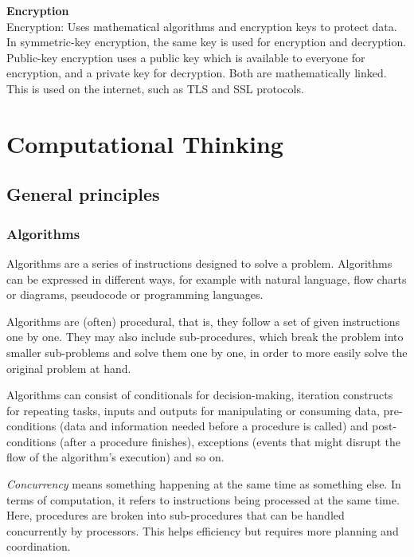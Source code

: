 \documentclass{article}
\begin{document}
\textbf{Encryption} \\
Encryption: Uses mathematical algorithms and encryption keys to protect data.
In symmetric-key encryption, the same key is used for encryption and
decryption. Public-key encryption uses a public key which is available to
everyone for encryption, and a private key for decryption. Both are
mathematically linked. This is used on the internet, such as TLS and SSL
protocols.

\section{Computational Thinking}

\subsection{General principles}

\subsubsection{Algorithms}
Algorithms are a series of instructions designed to solve a problem.
Algorithms can be expressed in different ways, for example with natural
language, flow charts or diagrams, pseudocode or programming languages.

Algorithms are (often) procedural, that is, they follow a set of given
instructions one by one. They may also include sub-procedures, which break the
problem into smaller sub-problems and solve them one by one, in order to more
easily solve the original problem at hand.

Algorithms can consist of conditionals for decision-making, iteration
constructs for repeating tasks, inputs and outputs for manipulating or
consuming data, pre-conditions (data and information needed before a procedure
is called) and post-conditions (after a procedure finishes), exceptions (events
that might disrupt the flow of the algorithm's execution) and so on.

\textit{Concurrency} means something happening at the same time as something
else. In terms of computation, it refers to instructions being processed at
the same time. Here, procedures are broken into sub-procedures that can be
handled concurrently by processors. This helps efficiency but requires more
planning and coordination.
\end{document}
